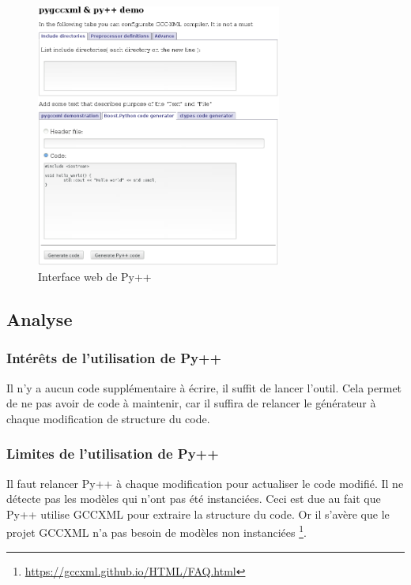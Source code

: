 \documentclass[11pt, french, screen]{report-rd-info}
\begin{document}
\begin{figure}[p]
    \centering
    \includegraphics[width=0.72\textwidth]{exemples/pyplusplus/ihm.png}
    \caption{Interface web de Py++}
    \label{fig:pyplusplusihm}
\end{figure}

\subsection{Analyse}

\subsubsection{Intérêts de l'utilisation de Py++}

Il n'y a aucun code supplémentaire à écrire, il suffit de lancer l'outil. Cela permet de ne pas avoir de code à maintenir, car il suffira de relancer le générateur à chaque modification de structure du code.

\subsubsection{Limites de l'utilisation de Py++}

Il faut relancer Py++ à chaque modification pour actualiser le code modifié. Il ne détecte pas les modèles qui n'ont pas été instanciées. Ceci est due au fait que Py++ utilise GCCXML pour extraire la structure du code. Or il s'avère que le projet GCCXML n'a pas besoin de modèles non instanciées \footnote{\url{https://gccxml.github.io/HTML/FAQ.html}}.
\end{document}
